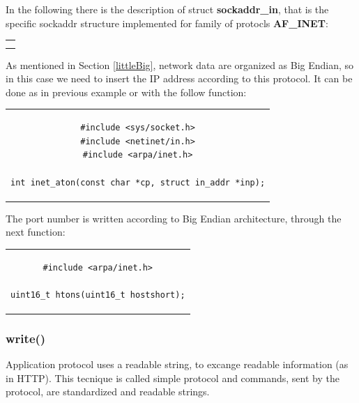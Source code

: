 In the following there is the description of struct \textbf{sockaddr\_in}, that is the specific sockaddr structure implemented for family of protocls \textbf{AF\_INET}:

\begin{center}
\begin{tabular}{c}
\begin{lstlisting}[linewidth=350pt, basicstyle=\footnotesize\sffamily,]
#include <netinet/in.h>

struct sockaddr_in {
    sa_family_t    sin_family; /* address family: AF_INET */
    in_port_t      sin_port;   /* port in network byte order */
    struct in_addr sin_addr;   /* internet address */
};

/* Internet address. */
struct in_addr {
    uint32_t       s_addr;     /* address in network byte order */
};\\
\end{lstlisting}
\end{tabular}
\end{center}
As mentioned in Section \ref{littleBig}, network data are organized as Big Endian, so in this case we need to insert the IP address according to this protocol. It can be done as in previous example or with the follow function:
\begin{center}
\begin{tabular}{c}
\begin{lstlisting}[linewidth=280pt, basicstyle=\footnotesize\sffamily,]
#include <sys/socket.h>
#include <netinet/in.h>
#include <arpa/inet.h>

int inet_aton(const char *cp, struct in_addr *inp);
\end{lstlisting}
\end{tabular}
\end{center}
The port number is written according to Big Endian architecture, through the next function:
\begin{center}
\begin{tabular}{c}
\begin{lstlisting}[linewidth=200pt, basicstyle=\footnotesize\sffamily,]
#include <arpa/inet.h>

uint16_t htons(uint16_t hostshort);
\end{lstlisting}
\end{tabular}
\end{center}

\subsubsection{write()}
Application protocol uses a readable string, to excange readable information (as in HTTP). This tecnique is called simple protocol and commands, sent by the protocol, are standardized and readable strings.  

